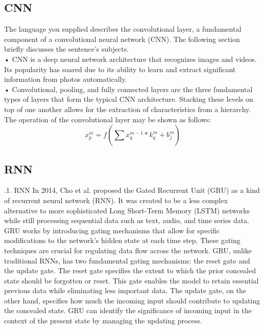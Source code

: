 \documentclass[a4paper,fleqn]{cas-sc}
\begin{document}
\subsection{CNN}
The language you supplied describes the convolutional layer, a fundamental component of a convolutional neural
network (CNN). The following section briefly discusses the sentence’s subjects.\\
• CNN is a deep neural network architecture that recognizes images and videos. Its popularity has soared due to
its ability to learn and extract significant information from photos automatically.\\
• Convolutional, pooling, and fully connected layers are the three fundamental types of layers that form the typical CNN architecture. Stacking these levels on top of one another allows for the extraction of characteristics from a hierarchy.\cite{}
The operation of the convolutional layer may be shown as follows:
\begin{equation}
x^{m}_p = f(\sum_{}^{}x^{m-1}_q*k^{m}_q+b^{m}_j)
\end{equation}

\subsection{RNN}
.1. RNN
In 2014, Cho et al. proposed the Gated Recurrent Unit (GRU) as a kind of recurrent neural network (RNN). It was created to be a less complex alternative to more sophisticated Long Short-Term Memory (LSTM) networks while still processing sequential data such as text, audio, and time series data. GRU works by introducing gating mechanisms that allow for specific modifications to the network’s hidden state at each time step. These gating techniques are crucial for regulating data flow across the network. GRU, unlike traditional RNNs, has two fundamental gating mechanisms: the reset gate and the update gate. The reset gate specifies the extent
to which the prior concealed state should be forgotten or reset. This gate enables the model to retain essential previous data while eliminating less important data. The update gate, on the other hand, specifies how much the incoming input should contribute to updating the concealed state. GRU can identify the significance of incoming input in the context of the present state by managing the updating process.\cite{}

\end{document}
